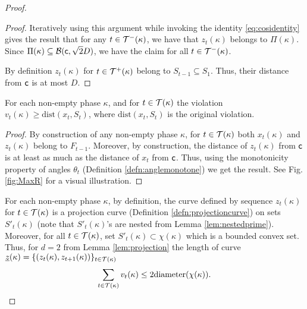 \begin{proof}
\begin{proof}
Iteratively using this argument while invoking the identity \eqref{eq:cosidentity} gives the result that for any $t \in \mathcal{T}^-(\kappa)$, we have that $z_{t}(\kappa)$  belongs to $\Pi(\kappa)$. Since $\Pi(\kappa) \subseteq \mathcal{B}({\mathsf{c}}, \sqrt{2}D)$, we have the claim for all $t\in \mathcal{T}^-(\kappa)$. 


%
%
%
%

By definition $z_{t}(\kappa)$ for $t\in \mathcal{T}^+(\kappa)$ belong to $S_{t-1}\subseteq S_1$. Thus, their distance from ${\mathsf{c}}$ is at most $D$. 
\end{proof}



\begin{lemma}\label{lem:violationub} For each non-empty phase $\kappa$, and for $t\in \mathcal{T}(\kappa)$ the violation $v_t(\kappa)\ge  \text{dist}(x_t, S_t)$, where $\text{dist}(x_t, S_t)$ is the original violation.
\end{lemma}
\begin{proof}
By construction of any non-empty phase $\kappa$, for $t\in \mathcal{T}(\kappa)$ both $x_t(\kappa)$ and $z_t(\kappa)$ belong to $F_{t-1}$. Moreover, by construction, the distance of $z_t(\kappa)$ from ${\mathsf{c}}$ is at least as much as the distance of $x_t$ from ${\mathsf{c}}$. Thus, using  the monotonicity property of angles $\theta_t$ (Definition \ref{defn:anglemonotone}) we get the result. See Fig. \ref{fig:MaxR} for a visual illustration.
\end{proof}



For each non-empty phase $\kappa$, by definition, the curve defined by sequence $z_{t}(\kappa)$ for $t\in\mathcal{T}(\kappa)$ is a projection curve (Definition \ref{defn:projectioncurve}) on sets $S'_t(\kappa)$ (note that $S'_t(\kappa)$'s  are nested from Lemma \ref{lem:nestedprime}). Moreover, for all $t\in\mathcal{T}(\kappa)$, set $S'_t(\kappa) \subset \chi(\kappa)$ which is a bounded convex set. 
Thus, for $d=2$ from Lemma \ref{lem:projection} the length of curve ${\underline z}(\kappa) = \{(z_{t}(\kappa), z_{t+1}(\kappa))\}_{t\in \mathcal{T}(\kappa)}$
\begin{equation}\label{eq:totallengthprojection}
\sum_{t\in \mathcal{T}(\kappa)} v_t(\kappa) \le 2
\text{diameter}(\chi(\kappa)).
\end{equation}



\end{proof}
